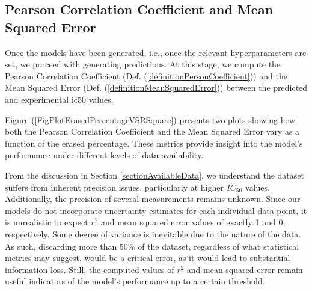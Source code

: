 \documentclass[11pt]{article}
\begin{document}
\subsection{Pearson Correlation Coefficient and Mean Squared Error}\label{sectionPersonCorrelationFactor}

Once the models have been generated, i.e., once the relevant hyperparameters are set, we proceed with generating predictions. At this stage, we compute the Pearson Correlation Coefficient (Def. (\ref{definitionPersonCoefficient})) and the Mean Squared Error (Def. (\ref{definitionMeanSquaredError})) between the predicted and experimental \gls{ic50} values.

Figure (\ref{FigPlotErasedPercentageVSRSquare}) presents two plots showing how both the Pearson Correlation Coefficient and the Mean Squared Error vary as a function of the erased percentage. These metrics provide insight into the model’s performance under different levels of data availability.

From the discussion in Section \ref{sectionAvailableData}, we understand the dataset suffers from inherent precision issues, particularly at higher $IC_{50}$ values. Additionally, the precision of several measurements remains unknown. Since our models do not incorporate uncertainty estimates for each individual data point, it is unrealistic to expect $r^2$ and mean squared error values of exactly 1 and 0, respectively. Some degree of variance is inevitable due to the nature of the data. As such, discarding more than 50\% of the dataset, regardless of what statistical metrics may suggest, would be a critical error, as it would lead to substantial information loss. Still, the computed values of $r^2$ and mean squared error remain useful indicators of the model's performance up to a certain threshold.
\end{document}
